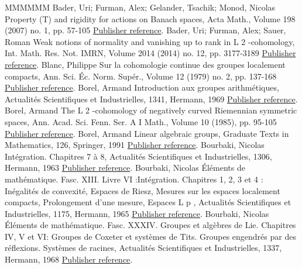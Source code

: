 \documentclass[11pt]{article}
\theoremstyle{definition}
\numberwithin{equation}{section}
\numberwithin{figure}{section}
\numberwithin{table}{section}
\begin{document}
\begin{thebibliography}{MMMMMM}
 Bader, Uri; Furman, Alex; Gelander, Tsachik; Monod, Nicolas Property (T) and rigidity for actions on Banach spaces, Acta Math., Volume 198 (2007) no. 1, pp. 57-105 \href{https://ahl.centre-mersenne.org/item/AHL_2020__3__1291_0/#BFGM}{Publisher reference}.
 Bader, Uri; Furman, Alex; Sauer, Roman Weak notions of normality and vanishing up to rank in L 2 -cohomology, Int. Math. Res. Not. IMRN, Volume 2014 (2014) no. 12, pp. 3177-3189 \href{https://ahl.centre-mersenne.org/item/AHL_2020__3__1291_0/#BFS}{Publisher reference}.
 Blanc, Philippe Sur la cohomologie continue des groupes localement compacts, Ann. Sci. Éc. Norm. Supér., Volume 12 (1979) no. 2, pp. 137-168 \href{https://ahl.centre-mersenne.org/item/AHL_2020__3__1291_0/#Bl}{Publisher reference}.
 Borel, Armand Introduction aux groupes arithmétiques, Actualités Scientifiques et Industrielles, 1341, Hermann, 1969 \href{https://ahl.centre-mersenne.org/item/AHL_2020__3__1291_0/#Borel-Arith}{Publisher reference}.
 Borel, Armand The L 2 -cohomology of negatively curved Riemennian symmetric spaces, Ann. Acad. Sci. Fenn. Ser. A I Math., Volume 10 (1985), pp. 95-105 \href{https://ahl.centre-mersenne.org/item/AHL_2020__3__1291_0/#Borel}{Publisher reference}.
 Borel, Armand Linear algebraic groups, Graduate Texts in Mathematics, 126, Springer, 1991 \href{https://ahl.centre-mersenne.org/item/AHL_2020__3__1291_0/#Borel-LAG}{Publisher reference}.
 Bourbaki, Nicolas Intégration. Chapitres 7 à 8, Actualités Scientifiques et Industrielles, 1306, Hermann, 1963 \href{https://ahl.centre-mersenne.org/item/AHL_2020__3__1291_0/#BBK-INT-7}{Publisher reference}.
 Bourbaki, Nicolas Éléments de mathématique. Fasc. XIII. Livre VI :Intégration. Chapitres 1, 2, 3 et 4 : Inégalités de convexité, Espaces de Riesz, Mesures sur les espaces localement compacts, Prolongement d’une mesure, Espaces L p , Actualités Scientifiques et Industrielles, 1175, Hermann, 1965 \href{https://ahl.centre-mersenne.org/item/AHL_2020__3__1291_0/#BBK-INT-1to4}{Publisher reference}.
 Bourbaki, Nicolas Éléments de mathématique. Fasc. XXXIV. Groupes et algèbres de Lie. Chapitres IV, V et VI: Groupes de Coxeter et systèmes de Tits. Groupes engendrés par des réflexions. Systèmes de racines, Actualités Scientifiques et Industrielles, 1337, Hermann, 1968 \href{https://ahl.centre-mersenne.org/item/AHL_2020__3__1291_0/#BBK-Lie-4to6}{Publisher reference}.

\end{thebibliography}
\end{document}
